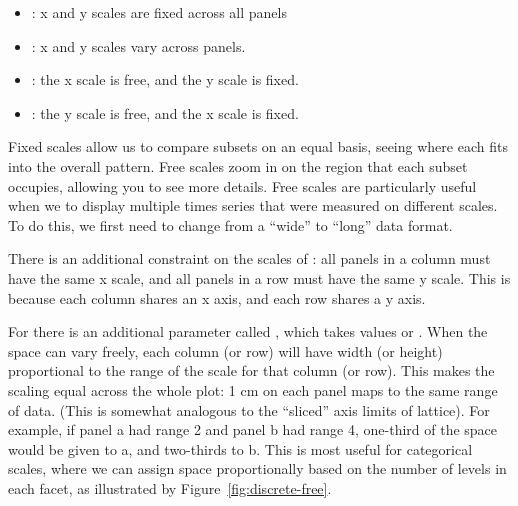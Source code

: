 \begin{itemize}
  \item {}: x and y scales are fixed across all panels
  \item {}: x and y scales vary across panels.
  \item {}: the x scale is free, and the y scale is fixed.
  \item {}: the y scale is free, and the x scale is fixed.
\end{itemize}

% 


Fixed scales allow us to compare subsets on an equal basis, seeing where each fits into the overall pattern.  Free scales zoom in on the region that each subset occupies, allowing you to see more details. Free scales are particularly useful when we to display multiple times series that were measured on different scales.  To do this, we first need to change from a ``wide'' to ``long'' data format.

% 


There is an additional constraint on the scales of : all panels in a column must have the same x scale, and all panels in a row must have the same y scale.  This is because each column shares an x axis, and each row shares a y axis.

For  there is an additional parameter called , which takes values  or .  When the space can vary freely, each column (or row) will have width (or height) proportional to the range of the scale for that column (or row).  This makes the scaling equal across the whole plot: 1 cm on each panel maps to the same range of data.  (This is somewhat analogous to the ``sliced'' axis limits of lattice).  For example, if panel a had range 2 and panel b had range 4, one-third of the space would be given to a, and two-thirds to b.  This is most useful for categorical scales, where we can assign space proportionally based on the number of levels in each facet, as illustrated by Figure~\ref{fig:discrete-free}.

